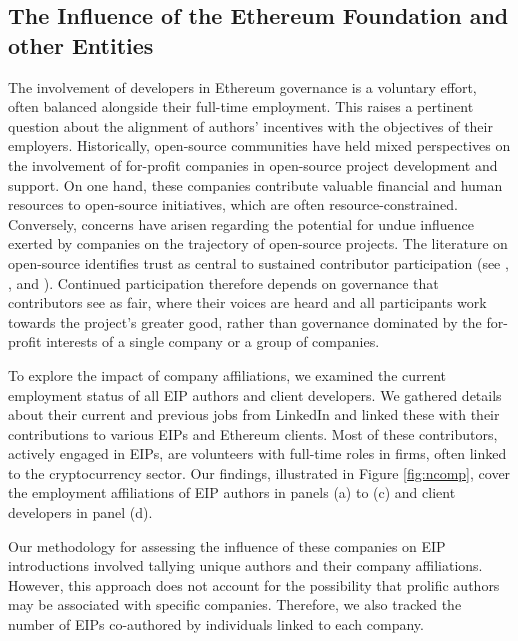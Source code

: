 \documentclass[No]{AEA}
\begin{document}
\subsection{The Influence of the Ethereum Foundation and other Entities} \label{subsec:companies}

The involvement of developers in Ethereum governance is a voluntary effort, often balanced alongside their full-time employment. This raises a pertinent question about the alignment of authors' incentives with the objectives of their employers. Historically, open-source communities have held mixed perspectives on the involvement of for-profit companies in open-source project development and support. On one hand, these companies contribute valuable financial and human resources to open-source initiatives, which are often resource-constrained. Conversely, concerns have arisen regarding the potential for undue influence exerted by companies on the trajectory of open-source projects. The literature on open-source identifies trust as central to sustained contributor participation (see \cite{Jarvenpaaetal2004}, \cite{Korsgaardetal1995}, and \cite{StewartGosain2006}). Continued participation therefore depends on governance that contributors see as fair, where their voices are heard and all participants work towards the project's greater good, rather than governance dominated by the for-profit interests of a single company or a group of companies.

To explore the impact of company affiliations, we examined the current employment status of all EIP authors and client developers. We gathered details about their current and previous jobs from LinkedIn and linked these with their contributions to various EIPs and Ethereum clients. Most of these contributors, actively engaged in EIPs, are volunteers with full-time roles in firms, often linked to the cryptocurrency sector. Our findings, illustrated in Figure \ref{fig:ncomp}, cover the employment affiliations of EIP authors in panels (a) to (c) and client developers in panel (d).

Our methodology for assessing the influence of these companies on EIP introductions involved tallying unique authors and their company affiliations. However, this approach does not account for the possibility that prolific authors may be associated with specific companies. Therefore, we also tracked the number of EIPs co-authored by individuals linked to each company.
\end{document}
